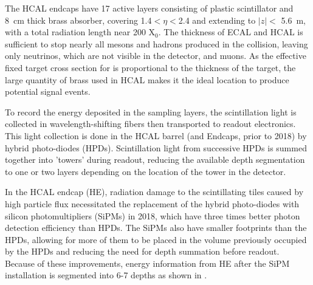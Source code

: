 The HCAL endcaps have 17 active layers consisting of plastic scintillator and \SI{8}{\centi\meter} thick brass absorber, covering 1.4$<\eta<$2.4 and extending to $\lvert z \rvert<$ \SI{5.6}{\meter}, with a total radiation length near 200 X$_0$. 
The thickness of ECAL and HCAL is sufficient to stop nearly all mesons and hadrons produced in the collision, leaving only neutrinos, which are not visible in the detector, and muons. 
As the effective fixed target cross section for \dbrem is proportional to the thickness of the target, the large quantity of brass used in HCAL makes it the ideal location to produce potential signal events.

To record the energy deposited in the sampling layers, the scintillation light is collected in wavelength-shifting fibers then transported to readout electronics.
This light collection is done in the HCAL barrel (and Endcaps, prior to 2018) by hybrid photo-diodes (HPDs). 
Scintillation light from successive HPDs is summed together into 'towers' during readout, reducing the available depth segmentation to one or two layers depending on the location of the tower in the detector.

In the HCAL endcap (HE), radiation damage to the scintillating tiles caused by high particle flux necessitated the replacement of the hybrid photo-diodes with silicon photomultipliers (SiPMs) in 2018, which have three times better photon detection efficiency than HPDs.  
The SiPMs also have smaller footprints than the HPDs, allowing for more of them to be placed in the volume previously occupied by the HPDs and reducing the need for depth summation before readout. 
Because of these improvements, energy information from HE after the SiPM installation is segmented into 6-7 depths as shown in .

